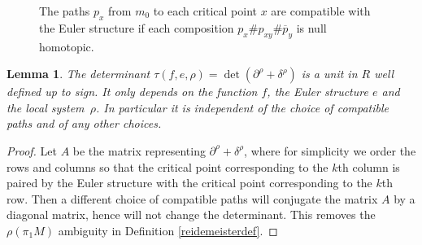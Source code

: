 \documentclass[JEP,XML,SOM,Unicode,NoFloatCountersInSection]{cedram}
\theoremstyle{plain}
\newtheorem{lemma}[theorem]{Lemma}
\theoremstyle{definition}
\begin{document}
\begin{figure}[htbp]
\begin{center}
\caption{\smaller The paths $p_x$ from $m_0$ to each critical point $x$ are compatible with the Euler structure if each composition $p_x\# p_{xy}\# \overline p_y$ is null homotopic.}
\label{Fig: Euler}
\end{center}
\end{figure}

\begin{lemma}\label{indet}
The determinant $\tau(f,e,\rho)=\det(\partial^\rho + \delta^\rho)$ is a unit in $R$ well defined up to sign. It only depends on the function $f$, the Euler structure $e$ and the local system~$\rho$. In particular it is independent of the choice of compatible paths and of any other choices.
\end{lemma}

\begin{proof}
Let $A$ be the matrix representing $\partial^\rho + \delta^\rho$, where for simplicity we order the rows and columns so that the critical point corresponding to the $k$th column is paired by the Euler structure with the critical point corresponding to the $k$th row. Then a different choice of compatible paths will conjugate the matrix $A$ by a diagonal matrix, hence will not change the determinant. This removes the $\rho(\pi_1M)$ ambiguity in Definition \ref{reidemeisterdef}.
\end{proof}
\end{document}
